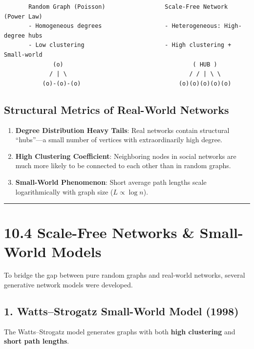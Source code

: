 \documentclass[
]{book}
\providecommand{\tightlist}{%
  \setlength{\itemsep}{0pt}\setlength{\parskip}{0pt}}
\theoremstyle{definition}
\theoremstyle{definition}
\theoremstyle{definition}
\theoremstyle{definition}
\theoremstyle{remark}
\begin{document}
\begin{verbatim}
       Random Graph (Poisson)                 Scale-Free Network (Power Law)
       - Homogeneous degrees                  - Heterogeneous: High-degree hubs
       - Low clustering                       - High clustering + Small-world
              (o)                                     ( HUB )
             / | \                                   / / | \ \
           (o)-(o)-(o)                            (o)(o)(o)(o)(o)
\end{verbatim}

\subsection{Structural Metrics of Real-World Networks}\label{structural-metrics-of-real-world-networks}

\begin{enumerate}
\def\labelenumi{\arabic{enumi}.}
\tightlist
\item
  \textbf{Degree Distribution Heavy Tails}: Real networks contain structural ``hubs''---a small number of vertices with extraordinarily high degree.
\item
  \textbf{High Clustering Coefficient}: Neighboring nodes in social networks are much more likely to be connected to each other than in random graphs.
\item
  \textbf{Small-World Phenomenon}: Short average path lengths scale logarithmically with graph size (\(L \propto \log n\)).
\end{enumerate}

\begin{center}\rule{0.5\linewidth}{0.5pt}\end{center}

\section{10.4 Scale-Free Networks \& Small-World Models}\label{scale-free-networks-small-world-models}

To bridge the gap between pure random graphs and real-world networks, several generative network models were developed.

\subsection{1. Watts--Strogatz Small-World Model (1998)}\label{wattsstrogatz-small-world-model-1998}

The Watts--Strogatz model generates graphs with both \textbf{high clustering} and \textbf{short path lengths}.
\end{document}
